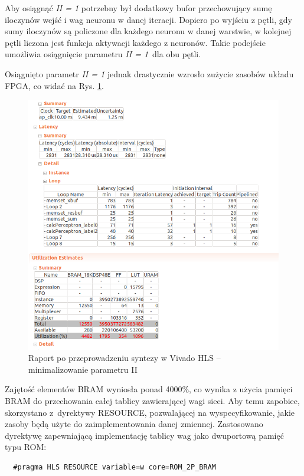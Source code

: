 Aby osiągnąć \emph{II = 1} potrzebny był dodatkowy bufor przechowujący sumę iloczynów wejść i wag neuronu w danej iteracji. Dopiero po wyjściu z pętli, gdy sumy iloczynów są policzone dla każdego neuronu w danej warstwie, w kolejnej pętli liczona jest funkcja aktywacji każdego z neuronów. Takie podejście umożliwia osiągnięcie parametru \emph{II = 1}~dla obu pętli.

Osiągnięto parametr \emph{II = 1} jednak drastycznie wzrosło zużycie zasobów układu FPGA, co widać na Rys. \ref{hls-report3}.

\begin{figure}[!h]
  \centering
  \includegraphics[width=\textwidth]{img/hls-report3.png}
  \caption{Raport po przeprowadzeniu syntezy w Vivado HLS -- minimalizowanie parametru II}
  \label{hls-report3}
\end{figure}

Zajętość elementów BRAM wyniosła ponad 4000\%, co wynika z użycia pamięci BRAM do przechowania całej tablicy zawierającej wagi sieci. Aby temu zapobiec, skorzystano z~dyrektywy RESOURCE, pozwalającej na wyspecyfikowanie, jakie zasoby będą użyte do zaimplementowania danej zmiennej. Zastosowano dyrektywę zapewniającą implementację tablicy wag jako dwuportową pamięć typu ROM:
\begin{verbatim}
  #pragma HLS RESOURCE variable=w core=ROM_2P_BRAM
\end{verbatim}



